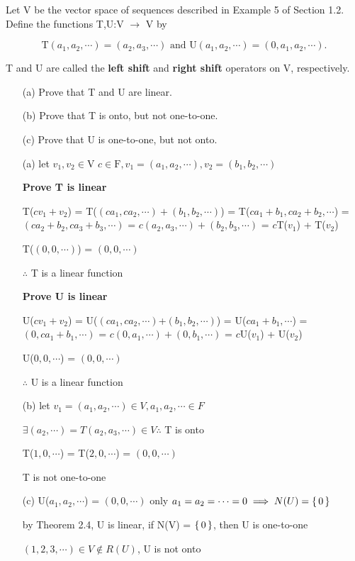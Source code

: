 Let V be the vector space of sequences described in Example 5 of Section 1.2. Define the functions T,U:V $\rightarrow$ V by

$$\mathrm{T}(a_1,a_2,\cdots) = (a_2,a_3,\cdots) \text{ and } \mathrm{U}(a_1,a_2,\cdots) = (0,a_1,a_2,\cdots).$$

T and U are called the \textbf{left shift} and \textbf{right shift} operators on V, respectively.

\begin{enumerate}
	\item[(a)] Prove that T and U are linear.
	\item[(b)] Prove that T is onto, but not one-to-one.
	\item[(c)] Prove that U is one-to-one, but not onto.
\end{enumerate}
	
\begin{tcolorbox}
\begin{solution}
	\begin{enumerate}
		\item[(a)] let $v_1,v_2 \in $V $c \in \mathrm{F}, v_1 = (a_1,a_2,\cdots), v_2 = (b_1,b_2,\cdots)$
		
		\textbf{Prove T is linear}
		
		T($cv_1 + v_2$) = T($(ca_1,ca_2,\cdots)+(b_1,b_2,\cdots)$) = T($ca_1+b_1,ca_2+b_2,\cdots$) = $(ca_2+b_2,ca_3+b_3,\cdots)$ = $c(a_2,a_3,\cdots)+(b_2,b_3,\cdots)$ = $c$T($v_1$) + T($v_2$)
		
		T($(0,0,\cdots)$) = $(0,0,\cdots)$
		
		$\therefore$ T is a linear function
		
		\textbf{Prove U is linear}
		
		U($cv_1+v_2$) = U($(ca_1,ca_2,\cdots)$+$(b_1,b_2,\cdots)$) = U($ca_1+b_1,\cdots$) = $(0,ca_1+b_1,\cdots)$ = $c(0,a_1,\cdots) + (0,b_1,\cdots)$ = $c$U($v_1$) + U($v_2$)
		
		U($0,0,\cdots$) = $(0,0,\cdots)$
		
		$\therefore$ U is a linear function
		
		\item[(b)] let $v_1 = (a_1,a_2,\cdots) \in V, a_1,a_2,\cdots \in F$
		
		$\exists (a_2,\cdots) = T(a_2,a_3,\cdots) \in V \therefore$ T is onto
		
		T($1,0,\cdots$) = T($2,0,\cdots$) = $(0,0,\cdots)$
		
		T is not one-to-one
		
		\item[(c)] U($a_1,a_2,\cdots$) = $(0,0,\cdots)$ only $a_1 = a_2 = \cdots = 0 \implies N(U) = \left\{ \,0 \,\right\}$
		
		by Theorem 2.4, U is linear, if N(V) = $\left\{ \,0 \,\right\}$, then U is one-to-one
		
		$(1,2,3,\cdots) \in V \notin R(U)$, U is not onto
		
	\end{enumerate}
\end{solution}

\end{tcolorbox}